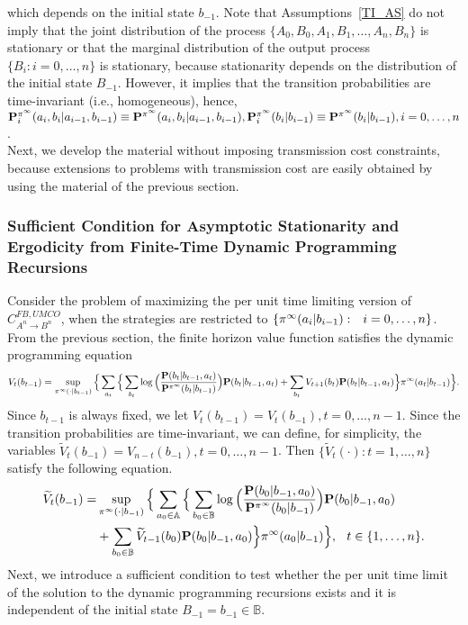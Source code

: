 \documentclass[11pt, a4paper, journal,onecolumn]{IEEEtran}
\newcommand{\mb}{\mathbb}
\newcommand{\rar}{\rightarrow}
\newcommand{\hso}{\hspace{.1in}}
\begin{document}
which depends on the initial state $b_{-1}$. Note that Assumptions~\ref{TI_AS} do not imply that the joint distribution of the process $\{A_0, B_0, A_1, B_1, \ldots, A_n, B_n\}$ is stationary or that the  marginal distribution of the output process $\{B_i: i=0, \ldots, n\}$ is stationary, because stationarity depends on the distribution of the initial state $B_{-1}$. However, it implies that the transition probabilities are time-invariant (i.e., homogeneous), hence,  ${\bf P}_i^{\pi^\infty}(a_i, b_i|a_{i-1}, b_{i-1})\equiv{\bf P}^{\pi^\infty}(a_i, b_i|a_{i-1}, b_{i-1}),  {\bf P}_i^{\pi^\infty}(b_i|b_{i-1})\equiv{\bf P}^{\pi^\infty}(b_i| b_{i-1}), i=0, \ldots, n$.  \\
Next, we develop the material without imposing  transmission cost constraints, because extensions to  problems with transmission cost are easily obtained by using the material of the previous section.

\subsubsection{Sufficient Condition for Asymptotic Stationarity and Ergodicity from Finite-Time Dynamic Programming Recursions}
Consider the problem of maximizing the per unit time limiting version of $C_{A^n \rar B^n}^{FB,UMCO}$, when  the strategies  are restricted to  $\{\pi^{\infty}(a_i|b_{i-1}): \hso i=0, \ldots, n\}$.  From the previous section, the  finite horizon  value function satisfies the dynamic programming equation
\begin{align}
V_t(b_{t-1})=\sup_{\pi^{\infty}(\cdot|b_{t-1})}\Big\{\sum_{a_t}\Big\{\sum_{b_t}\log\Big(\frac{{\bf P}(b_t|b_{t-1},a_t)}{{\bf P}^{\pi^{\infty}}(b_t|b_{t-1})}\Big){\bf P}(b_t|b_{t-1},a_t)
+\sum_{b_t}V_{t+1}(b_t){\bf P}(b_t|b_{t-1},a_t)\Big\}\pi^{\infty}(a_t|b_{t-1})\Big\}. \label{DP_Rev}
\end{align}
Since $b_{t-1}$ is always fixed, we let $V_t(b_{t-1})=V_t(b_{-1}), t=0, \ldots, n-1$. Since the transition probabilities are time-invariant, we can define, for simplicity, the variables $\widetilde{V}_t(b_{-1})=V_{n-t}(b_{-1}), t=0, \ldots, n-1$. Then $\{\widetilde{V}_t(\cdot): t=1, \ldots,n\}$ satisfy the following equation.
\begin{align}\label{inf.DP1}
\widetilde{V}_t(b_{-1})=&\sup_{\pi^{\infty}(\cdot|b_{-1})}\Big\{\sum_{a_0 \in {\mb A}}\Big\{\sum_{b_0 \in {\mb B}}\log\Big(\frac{{\bf P}(b_0|b_{-1},a_0)}{{\bf P}^{\pi^{\infty}}(b_0|b_{-1})}\Big){\bf P}(b_0|b_{-1},a_0)\nonumber\\
&+\sum_{b_0 \in {\mb B}}\widetilde{V}_{t-1}(b_0){\bf P}(b_0|b_{-1},a_0)\Big\}\pi^{\infty}(a_0|b_{-1})\Big\}, \hso t \in \{1, \ldots, n\}.
\end{align}
Next, we introduce a sufficient condition to test whether the per unit time limit of the solution to the   dynamic programming recursions exists and it is independent of the initial state $B_{-1}=b_{-1} \in {\mb B}$.  \\
\end{document}
